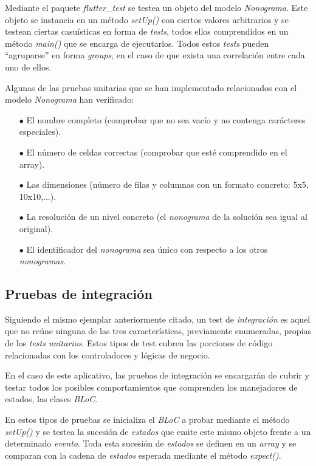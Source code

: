  Mediante el paquete \textit{flutter\_test} se testea un objeto del
 modelo \textit{Nonograma}. Este objeto se instancia en un método \textit{setUp()} con ciertos valores 
 arbitrarios y se testean ciertas casuísticas en forma de \textit{tests}, 
 todos ellos comprendidos en un método \textit{main()}
 que se encarga de ejecutarlos.
 Todos estos \textit{tests} pueden ``agruparse'' en forma \textit{groups}, en el caso de que exista una correlación
 entre cada uno de ellos.

 Algunas de las pruebas unitarias que se han implementado relacionados con el modelo \textit{Nonograma}
 han verificado:

 \begin{itemize}
    \item[$\bullet$] El nombre completo (comprobar que no sea vacío y no contenga carácteres especiales).
    \item[$\bullet$] El número de celdas correctas (comprobar que esté comprendido en el array).
    \item[$\bullet$] Las dimensiones (número de filas y columnas con un formato concreto: 5x5, 10x10,...).
    \item[$\bullet$] La resolución de un nivel concreto (el \textit{nonograma} de la solución sea igual al original).
    \item[$\bullet$] El identificador del \textit{nonograma} sea único con respecto a los otros \textit{nonogramas}.
 \end{itemize}

 \subsection{Pruebas de integración}
 Siguiendo el mismo ejemplar anteriormente citado, un test de \textit{integración} es aquel que no reúne ninguna
 de las tres características, previamente enumeradas, propias de los \textit{tests unitarios}.
 Estos tipos de test cubren las porciones de código relacionadas con los controladores y
 lógicas de negocio.

 En el caso de este aplicativo, las pruebas de integración se encargarán de cubrir y testar todos los posibles comportamientos
 que comprenden los manejadores de estados, las clases \textit{BLoC}.

 En estos tipos de pruebas se inicializa el \textit{BLoC} a probar mediante
 el método \textit{setUp()} y se testea la sucesión de \textit{estados} que emite este mismo
 objeto frente a un determinado \textit{evento}. Toda esta sucesión de \textit{estados} se definen en un \textit{array}
 y se comparan con la cadena de \textit{estados} esperada mediante el método \textit{expect()}.

